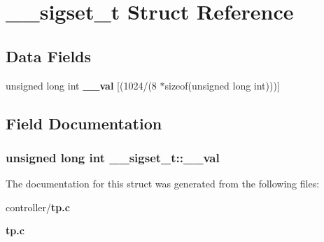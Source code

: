\section{\_\-\_\-sigset\_\-t Struct Reference}
\label{struct____sigset__t}
\subsection*{Data Fields}
\begin{DoxyCompactItemize}
\item 
unsigned long int {\bf \_\-\_\-val} [(1024/(8 $\ast$sizeof(unsigned long int)))]
\end{DoxyCompactItemize}


\subsection{Field Documentation}
\subsubsection[{\_\-\_\-val}]{\setlength{\rightskip}{0pt plus 5cm}unsigned long int {\bf \_\-\_\-sigset\_\-t::\_\-\_\-val}}\label{struct____sigset__t_a0e131a0eaa4d6dfd7baa1da69b2b33de}


The documentation for this struct was generated from the following files:\begin{DoxyCompactItemize}
\item 
controller/{\bf tp.c}\item 
{\bf tp.c}\end{DoxyCompactItemize}
